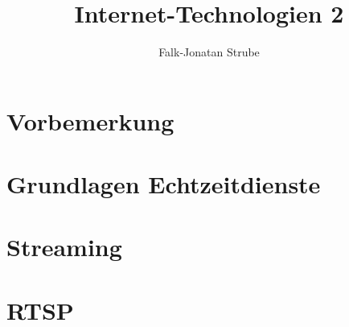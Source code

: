 \documentclass{scrreprt}
\title{Internet-Technologien 2}
\author{Falk-Jonatan Strube}
\begin{document}
\maketitle
\tableofcontents

\chapter*{Vorbemerkung}

\chapter{Grundlagen Echtzeitdienste}


\chapter{Streaming}


\chapter{RTSP}



\end{document}
